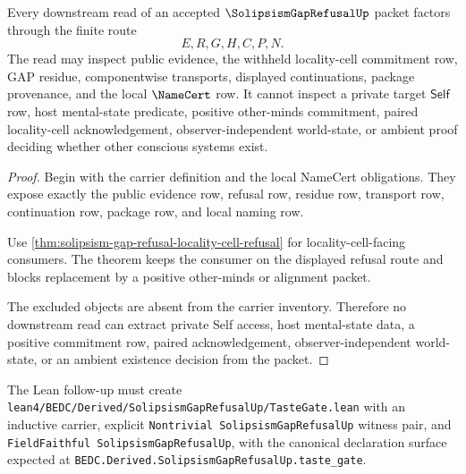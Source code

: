 \begin{theorem}
\label{thm:solipsism-gap-refusal-nonescape}
Every downstream read of an accepted $\SolipsismGapRefusalUp$ packet factors through the finite route
$$
E,R,G,H,C,P,N.
$$
The read may inspect public evidence, the withheld locality-cell commitment row, GAP residue, componentwise transports, displayed continuations, package provenance, and the local $\NameCert$ row. It cannot inspect a private target $\mathsf{Self}$ row, host mental-state predicate, positive other-minds commitment, paired locality-cell acknowledgement, observer-independent world-state, or ambient proof deciding whether other conscious systems exist.
\end{theorem}
\begin{proof}
Begin with the carrier definition and the local NameCert obligations. They expose exactly the public evidence row, refusal row, residue row, transport row, continuation row, package row, and local naming row.

Use \autoref{thm:solipsism-gap-refusal-locality-cell-refusal} for locality-cell-facing consumers. The theorem keeps the consumer on the displayed refusal route and blocks replacement by a positive other-minds or alignment packet.

The excluded objects are absent from the carrier inventory. Therefore no downstream read can extract private Self access, host mental-state data, a positive commitment row, paired acknowledgement, observer-independent world-state, or an ambient existence decision from the packet.
\end{proof}



The Lean follow-up must create \texttt{lean4/BEDC/Derived/SolipsismGapRefusalUp/TasteGate.lean} with an inductive carrier, explicit \texttt{Nontrivial SolipsismGapRefusalUp} witness pair, and \texttt{FieldFaithful SolipsismGapRefusalUp}, with the canonical declaration surface expected at \texttt{BEDC.Derived.SolipsismGapRefusalUp.taste\_gate}.

